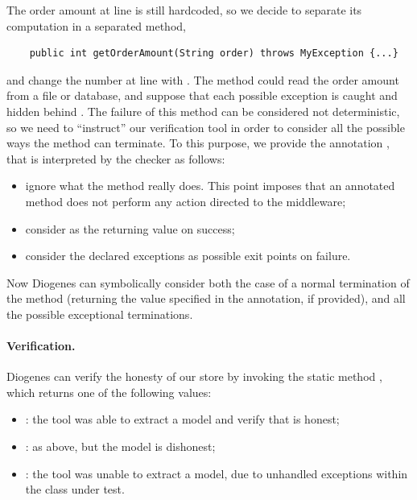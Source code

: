 The order amount at line  is still hardcoded, so we decide to separate its computation
in a separated method, \eg
\begin{mdframed}
  \begin{verbatim}
    public int getOrderAmount(String order) throws MyException {...}
  \end{verbatim}
\end{mdframed}
and change the number  at line  with .
The method could read the order amount from a file or database,
and suppose that each possible exception
is caught and hidden behind . 
The failure of this method can be considered not deterministic,
so we need to ``instruct'' our verification tool
in order to consider all the possible ways the method can terminate.
% 
To this purpose, we provide the annotation , that
is interpreted by the checker as follows:
\begin{itemize}[noitemsep,topsep=0pt]
\item ignore what the method really does. 
  This point imposes that an annotated method does not perform any action
    directed to the middleware;
\item consider  as the returning value on success;
\item consider the declared exceptions as possible exit points on failure.
\end{itemize}

Now Diogenes can symbolically consider both the case of a normal 
termination of the method
(returning the value specified in the annotation, if provided),
and all the possible exceptional terminations.

\paragraph{Verification.}
Diogenes can verify the honesty of our store 
by invoking the static method
,
which returns one of the following values:
\begin{itemize}[noitemsep,topsep=0pt]
\item {}: the tool was able to extract a \coco model and verify that is honest;
\item {}: as above, but the model is dishonest;
\item {}: the tool was unable to extract a model,
  \eg due to unhandled exceptions within the class under test.
\end{itemize}


